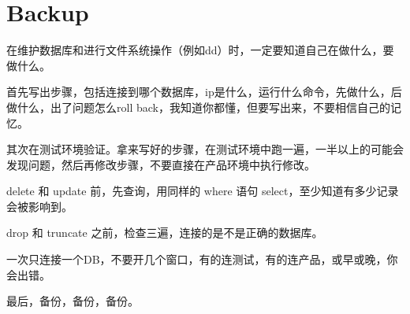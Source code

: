 \part{Backup}


在维护数据库和进行文件系统操作（例如dd）时，一定要知道自己在做什么，要做什么。

首先写出步骤，包括连接到哪个数据库，ip是什么，运行什么命令，先做什么，后做什么，出了问题怎么roll back，我知道你都懂，但要写出来，不要相信自己的记忆。

其次在测试环境验证。拿来写好的步骤，在测试环境中跑一遍，一半以上的可能会发现问题，然后再修改步骤，不要直接在产品环境中执行修改。

\begin{compactitem}
\item delete 和 update 前，先查询，用同样的 where 语句 select，至少知道有多少记录会被影响到。
\item drop 和 truncate 之前，检查三遍，连接的是不是正确的数据库。
\end{compactitem}

一次只连接一个DB，不要开几个窗口，有的连测试，有的连产品，或早或晚，你会出错。

最后，备份，备份，备份。



